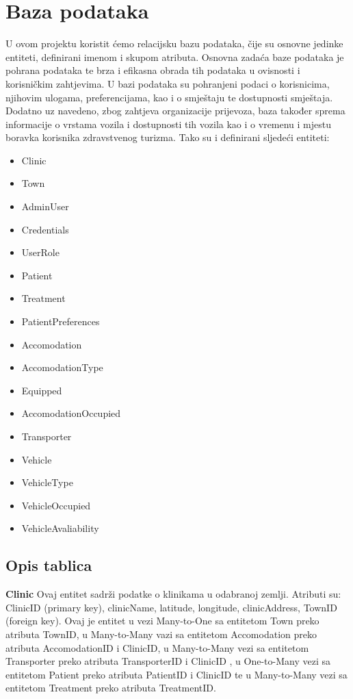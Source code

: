 				
		\section{Baza podataka}
			
			
			U ovom projektu koristit ćemo relacijsku bazu podataka, čije su osnovne jedinke entiteti, definirani imenom i skupom atributa. Osnovna zadaća baze podataka je pohrana podataka te brza i efikasna obrada tih podataka u ovisnosti i korisničkim zahtjevima. U bazi podataka su pohranjeni podaci o korisnicima, njihovim ulogama, preferencijama, kao i o smještaju te dostupnosti smještaja. Dodatno uz navedeno, zbog zahtjeva organizacije prijevoza, baza također sprema informacije o vrstama vozila i dostupnosti tih vozila kao i o vremenu i mjestu boravka korisnika zdravstvenog turizma. Tako su i definirani sljedeći entiteti:
			\begin{itemize}
				\item Clinic
				\item Town
				\item AdminUser
				\item Credentials
				\item UserRole
				\item Patient
				\item Treatment
				\item PatientPreferences
				\item Accomodation
				\item AccomodationType
				\item Equipped
				\item AccomodationOccupied
				\item Transporter
				\item Vehicle
				\item VehicleType
				\item VehicleOccupied
				\item VehicleAvaliability
			\end{itemize}
		
			\subsection{Opis tablica}
			
				\textbf{Clinic} Ovaj entitet sadrži podatke o klinikama u odabranoj zemlji. Atributi su: ClinicID (primary key), clinicName, latitude, longitude, clinicAddress, TownID (foreign key). Ovaj je entitet u vezi Many-to-One sa entitetom Town preko atributa TownID, u Many-to-Many vazi sa entitetom Accomodation preko atributa AccomodationID i ClinicID, u Many-to-Many vezi sa entitetom Transporter preko atributa TransporterID i ClinicID , u One-to-Many vezi sa entitetom Patient preko atributa PatientID i ClinicID te u Many-to-Many vezi sa entitetom Treatment preko atributa TreatmentID.
				

